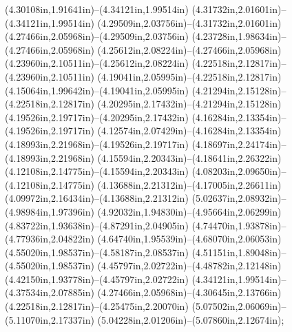 (4.30108in,1.91641in)--(4.34121in,1.99514in) (4.31732in,2.01601in)--(4.34121in,1.99514in) (4.29509in,2.03756in)--(4.31732in,2.01601in) (4.27466in,2.05968in)--(4.29509in,2.03756in) (4.23728in,1.98634in)--(4.27466in,2.05968in) (4.25612in,2.08224in)--(4.27466in,2.05968in) (4.23960in,2.10511in)--(4.25612in,2.08224in) (4.22518in,2.12817in)--(4.23960in,2.10511in) (4.19041in,2.05995in)--(4.22518in,2.12817in) (4.15064in,1.99642in)--(4.19041in,2.05995in) (4.21294in,2.15128in)--(4.22518in,2.12817in) (4.20295in,2.17432in)--(4.21294in,2.15128in) (4.19526in,2.19717in)--(4.20295in,2.17432in) (4.16284in,2.13354in)--(4.19526in,2.19717in) (4.12574in,2.07429in)--(4.16284in,2.13354in) (4.18993in,2.21968in)--(4.19526in,2.19717in) (4.18697in,2.24174in)--(4.18993in,2.21968in) (4.15594in,2.20343in)--(4.18641in,2.26322in) (4.12108in,2.14775in)--(4.15594in,2.20343in) (4.08203in,2.09650in)--(4.12108in,2.14775in) (4.13688in,2.21312in)--(4.17005in,2.26611in) (4.09972in,2.16434in)--(4.13688in,2.21312in) (5.02637in,2.08932in)--(4.98984in,1.97396in) (4.92032in,1.94830in)--(4.95664in,2.06299in) (4.83722in,1.93638in)--(4.87291in,2.04905in) (4.74470in,1.93878in)--(4.77936in,2.04822in) (4.64740in,1.95539in)--(4.68070in,2.06053in) (4.55020in,1.98537in)--(4.58187in,2.08537in) (4.51151in,1.89048in)--(4.55020in,1.98537in) (4.45797in,2.02722in)--(4.48782in,2.12148in) (4.42150in,1.93778in)--(4.45797in,2.02722in) (4.34121in,1.99514in)--(4.37534in,2.07885in) (4.27466in,2.05968in)--(4.30645in,2.13766in) (4.22518in,2.12817in)--(4.25475in,2.20070in) (5.07502in,2.06069in)--(5.11070in,2.17337in) (5.04228in,2.01206in)--(5.07860in,2.12674in);
